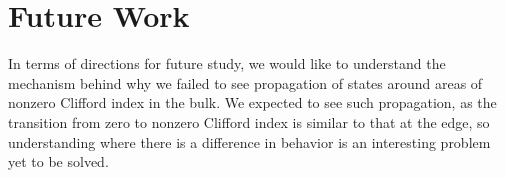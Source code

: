 \documentclass[a4paper]{article}
\begin{document}
\section{Future Work}

In terms of directions for future study, we would like to understand the mechanism behind why we failed to see propagation of states around areas of nonzero Clifford index in the bulk. We expected to see such propagation, as the transition from zero to nonzero Clifford index is similar to that at the edge, so understanding where there is a difference in behavior is an interesting problem yet to be solved.

\printbibliography
\end{document}
